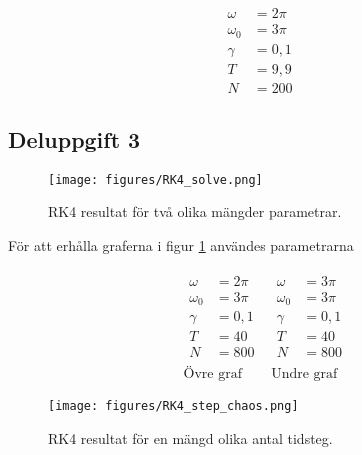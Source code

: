 \documentclass[12pt]{article}
\begin{document}
\begin{align*}
    \omega &= 2 \pi\\
    \omega_0 &= 3 \pi\\
    \gamma &= 0,1\\
    T &= 9,9\\
    N &= 200
\end{align*}

\subsection{Deluppgift 3}

\begin{figure}[H]
    \begin{small}
        \begin{center}
            \texttt{[image: figures/RK4\_solve.png]}
        \end{center}
        \caption{RK4 resultat för två olika mängder parametrar.}
        \label{fig:RK4-solve}
    \end{small}
\end{figure}

För att erhålla graferna i figur \ref{fig:RK4-solve} användes parametrarna

\begin{align*}
    &
    \begin{aligned}
        \omega &= 2 \pi\\
        \omega_0 &= 3 \pi\\
        \gamma &= 0,1\\
        T &= 40\\
        N &= 800
    \end{aligned}
    &
    \begin{aligned}
        \omega &= 3 \pi\\
        \omega_0 &= 3 \pi\\
        \gamma &= 0,1\\
        T &= 40\\
        N &= 800
    \end{aligned}\\
    &\text{Övre graf}
    &\text{Undre graf}
    \end{align*}

\begin{figure}[H]
    \begin{small}
        \begin{center}
            \texttt{[image: figures/RK4\_step\_chaos.png]}
        \end{center}
        \caption{RK4 resultat för en mängd olika antal tidsteg.}
        \label{fig:RK4-stability}
    \end{small}
\end{figure}
\end{document}
